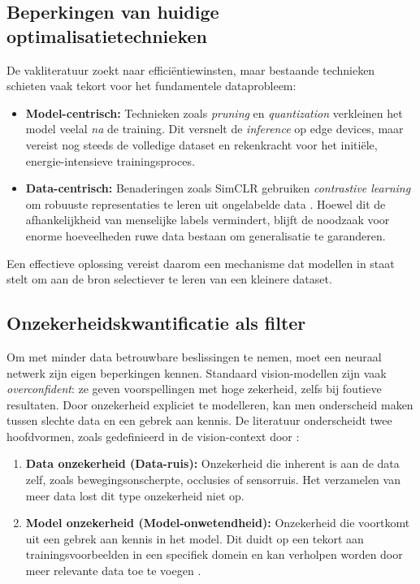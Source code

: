 \subsection{Beperkingen van huidige optimalisatietechnieken} 
De vakliteratuur zoekt naar efficiëntiewinsten, maar bestaande technieken schieten vaak tekort voor het fundamentele dataprobleem:
\begin{itemize} 
    \item \textbf{Model-centrisch:} Technieken zoals \textit{pruning} en \textit{quantization} verkleinen het model veelal \textit{na} de training. Dit versnelt de \textit{inference} op edge devices, maar vereist nog steeds de volledige dataset en rekenkracht voor het initiële, energie-intensieve trainingsproces.
    \item \textbf{Data-centrisch:} Benaderingen zoals SimCLR gebruiken \textit{contrastive learning} om robuuste representaties te leren uit ongelabelde data \autocite{chen2020simple}. Hoewel dit de afhankelijkheid van menselijke labels vermindert, blijft de noodzaak voor enorme hoeveelheden ruwe data bestaan om generalisatie te garanderen. 
\end{itemize} 
Een effectieve oplossing vereist daarom een mechanisme dat modellen in staat stelt om aan de bron selectiever te leren van een kleinere dataset.\\

\subsection{Onzekerheidskwantificatie als filter} 
Om met minder data betrouwbare beslissingen te nemen, moet een neuraal netwerk zijn eigen beperkingen kennen. Standaard vision-modellen zijn vaak \textit{overconfident}: ze geven voorspellingen met hoge zekerheid, zelfs bij foutieve resultaten. Door onzekerheid expliciet te modelleren, kan men onderscheid maken tussen slechte data en een gebrek aan kennis. De literatuur onderscheidt twee hoofdvormen, zoals gedefinieerd in de vision-context door \textcite{kendall2017uncertainties}:

\begin{enumerate} 
    \item \textbf{Data onzekerheid (Data-ruis):} Onzekerheid die inherent is aan de data zelf, zoals bewegingsonscherpte, occlusies of sensorruis. Het verzamelen van meer data lost dit type onzekerheid niet op.
    \item \textbf{Model onzekerheid (Model-\newline onwetendheid):} Onzekerheid die voortkomt uit een gebrek aan kennis in het model. Dit duidt op een tekort aan trainingsvoorbeelden in een specifiek domein en kan verholpen worden door meer relevante data toe te voegen \autocite{hullermeier2021aleatoric}. 
\end{enumerate}

